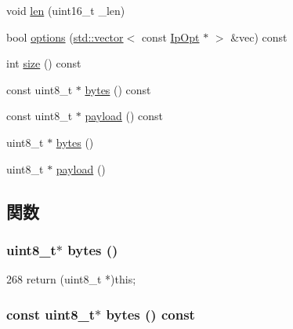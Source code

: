 \begin{DoxyCompactItemize}
\item 
void \hyperlink{structNet_1_1IpHdr_a6d227a891dced5a88df38f29d545e8aa}{len} (uint16\_\-t \_\-len)
\item 
bool \hyperlink{structNet_1_1IpHdr_a0a9696ccdde553123aa20c1e2c63ccee}{options} (\hyperlink{classstd_1_1vector}{std::vector}$<$ const \hyperlink{structNet_1_1IpOpt}{IpOpt} $\ast$ $>$ \&vec) const 
\item 
int \hyperlink{structNet_1_1IpHdr_ab8e4e3e2a7bf18888b71bdf9dda0770b}{size} () const 
\item 
const uint8\_\-t $\ast$ \hyperlink{structNet_1_1IpHdr_aaa586eeaf354005403ca8e20f961b6c3}{bytes} () const 
\item 
const uint8\_\-t $\ast$ \hyperlink{structNet_1_1IpHdr_a5f0d069ddb9d067af9e94963bd1fc7a2}{payload} () const 
\item 
uint8\_\-t $\ast$ \hyperlink{structNet_1_1IpHdr_add4fb6fe45a091194dc9eac521194698}{bytes} ()
\item 
uint8\_\-t $\ast$ \hyperlink{structNet_1_1IpHdr_a79ce21e3572e587b71de7af1ac640b6f}{payload} ()
\end{DoxyCompactItemize}


\subsection{関数}
\hypertarget{structNet_1_1IpHdr_add4fb6fe45a091194dc9eac521194698}{
\subsubsection[{bytes}]{\setlength{\rightskip}{0pt plus 5cm}uint8\_\-t$\ast$ bytes ()}}
\label{structNet_1_1IpHdr_add4fb6fe45a091194dc9eac521194698}



\begin{DoxyCode}
268 { return (uint8_t *)this; }
\end{DoxyCode}
\hypertarget{structNet_1_1IpHdr_aaa586eeaf354005403ca8e20f961b6c3}{
\subsubsection[{bytes}]{\setlength{\rightskip}{0pt plus 5cm}const uint8\_\-t$\ast$ bytes () const}}
\label{structNet_1_1IpHdr_aaa586eeaf354005403ca8e20f961b6c3}



